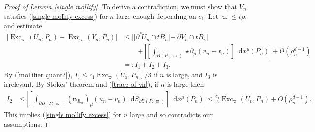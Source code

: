 \documentclass[reqno,11pt]{amsart}
\DeclareMathOperator{\Exc}{Exc}
\newcommand*\dif{\mathop{}\!\mathrm{d}}
\newcommand{\normal}{\mathbf n}
\theoremstyle{definition}
\numberwithin{equation}{section}
\begin{document}
\begin{proof}[Proof of Lemma \ref{single mollify}]
To derive a contradiction, we must show that $V_n$ satisfies (\ref{single mollify excess}) for $n$ large enough depending on $c_1$.
Let $\varpi \leq t\rho$, and estimate
\begin{align*}
    |\Exc_\varpi(U_n, P_n) - \Exc_\varpi(V_n, P_n)|
    &\leq ||\partial^* U_n \cap t B_n| - |\partial V_n \cap t B_n||\\
    &\qquad + \left|\left[\int_{B(P_n, \varpi)} \star \partial_\mu(u_n - v_n) \right] \dif x^\mu(P_n)\right| + O(\rho_n^{d + 1}) \\
    &=: I_1 + I_2 + I_3.
\end{align*}
By (\ref{mollifier quant2}), $I_1 \leq c_1 \Exc_\varpi(U_n, P_n)/3$ if $n$ is large, and $I_3$ is irrelevant.
By Stokes' theorem and (\ref{trace of vn}), if $n$ is large then
\begin{align*}
    I_2 &\leq \left|\left[\int_{\partial B(P, \varpi)} (\normal_{B_\varpi})_\mu (u_n - v_n) \dif S_{\partial B(P, \varpi)}\right] \dif x^\mu(P_n)\right| \leq \frac{c_1}{3} \Exc_\varpi(U_n, P_n) + O(\rho_n^{d + 1}).
\end{align*}
This implies (\ref{single mollify excess}) for $n$ large and so contradicts our assumptions.
\end{proof}


\printbibliography
\end{document}
